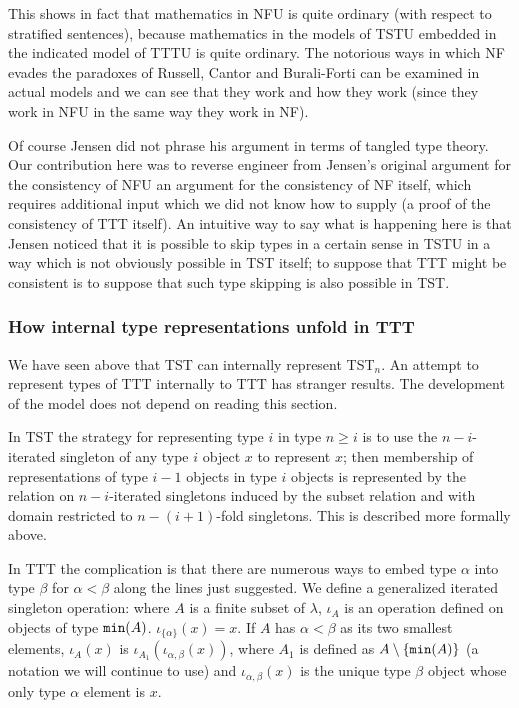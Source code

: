\documentclass[112pt]{article}
\begin{document}
\begin{description}
This shows in fact that mathematics in NFU is quite ordinary (with respect to stratified sentences), because mathematics in the models of TSTU embedded in the indicated model of TTTU is quite ordinary.  The notorious ways in which NF evades the paradoxes of Russell, Cantor and Burali-Forti can be examined in actual models and we can see that they work and how they work (since they work in NFU in the same way they work in NF).

\end{description}

Of course Jensen did not phrase his argument in terms of tangled type theory.  Our contribution here was to reverse engineer from Jensen's original argument for the consistency of NFU an argument for the consistency of NF itself, which requires additional input which we did not know how to supply (a proof of the consistency of TTT itself).  An intuitive way to say what is happening here is that Jensen noticed that it is possible to skip types in a certain sense in TSTU in a way which is not obviously possible in TST itself;  to suppose that TTT might be consistent is to suppose that such type skipping is also possible in TST.

\newpage



\subsubsection{How internal type representations unfold in TTT}

We have seen above that TST can internally represent TST$_n$.   An attempt to represent types of TTT internally to TTT has stranger results.  The development of the model does not depend on reading this section.

In TST the strategy for representing type $i$ in type $n\geq i$  is to use the $n-i$-iterated singleton of any type $i$ object $x$ to represent $x$;  then membership of representations of type $i-1$ objects in type
$i$ objects is represented by the relation on $n-i$-iterated singletons induced by the subset relation and with domain restricted to $n-(i+1)$-fold singletons.  This is described more formally above.

In TTT the complication is that there are numerous ways to embed type $\alpha$ into type $\beta$ for $\alpha<\beta$ along the lines just suggested.    We define a generalized
iterated singleton operation:  where $A$ is a finite subset of $\lambda$, $\iota_A$ is an operation defined on objects of type ${\tt min}(A)$.  $\iota_{\{\alpha\}}(x)=x$.
If $A$ has $\alpha<\beta$ as its two smallest elements, $\iota_A(x)$ is  $\iota_{A_1}(\iota_{\alpha,\beta}(x))$, where $A_1$ is defined as $A \setminus \{{\tt min}(A)\}$ (a notation we will continue to use) and $\iota_{\alpha,\beta}(x)$ is the unique type $\beta$ object whose only type $\alpha$ element is $x$.
\end{document}
